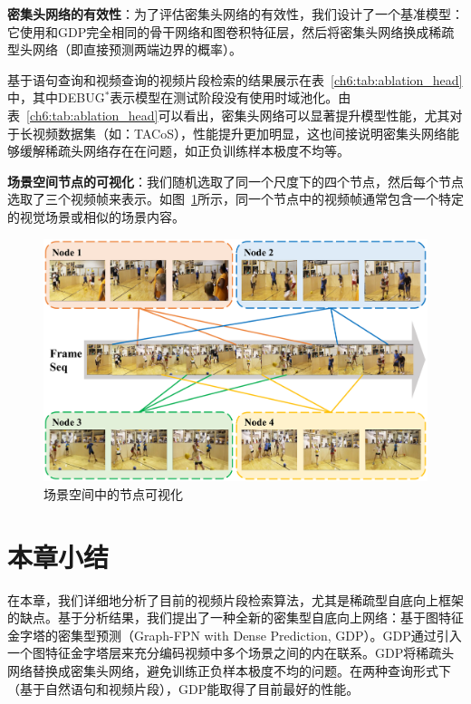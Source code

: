 \textbf{密集头网络的有效性}：为了评估密集头网络的有效性，我们设计了一个基准模型：它使用和GDP完全相同的骨干网络和图卷积特征层，然后将密集头网络换成稀疏型头网络（即直接预测两端边界的概率）。

基于语句查询和视频查询的视频片段检索的结果展示在表~\ref{ch6:tab:ablation_head}中，其中DEBUG$^*$表示模型在测试阶段没有使用时域池化。由表~\ref{ch6:tab:ablation_head}可以看出，密集头网络可以显著提升模型性能，尤其对于长视频数据集（如：TACoS），性能提升更加明显，这也间接说明密集头网络能够缓解稀疏头网络存在在问题，如正负训练样本极度不均等。


\textbf{场景空间节点的可视化}：我们随机选取了同一个尺度下的四个节点，然后每个节点选取了三个视频帧来表示。如图~\ref{ch6:fig:node_visualization}所示，同一个节点中的视频帧通常包含一个特定的视觉场景或相似的场景内容。


\begin{figure}[htbp]
    \centering
    \includegraphics[width=0.9\linewidth]{chapter6/res/node_visualization.pdf}
    \caption{场景空间中的节点可视化}
    \label{ch6:fig:node_visualization}
\end{figure}


\section{本章小结}
在本章，我们详细地分析了目前的视频片段检索算法，尤其是稀疏型自底向上框架的缺点。基于分析结果，我们提出了一种全新的密集型自底向上网络：基于图特征金字塔的密集型预测（Graph-FPN with Dense Prediction, GDP）。GDP通过引入一个图特征金字塔层来充分编码视频中多个场景之间的内在联系。GDP将稀疏头网络替换成密集头网络，避免训练正负样本极度不均的问题。在两种查询形式下（基于自然语句和视频片段），GDP能取得了目前最好的性能。
